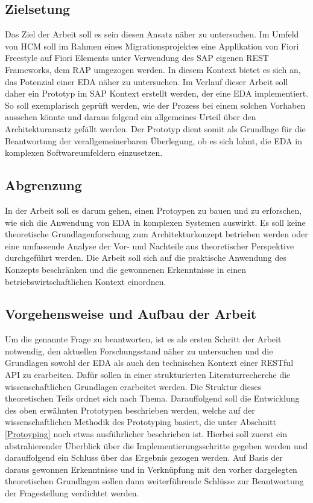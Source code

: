 \subsection{Zielsetung}
Das Ziel der Arbeit soll es sein diesen Ansatz näher zu untersuchen. Im Umfeld von HCM soll im Rahmen eines Migrationsprojektes eine Applikation von Fiori Freestyle auf Fiori Elements unter Verwendung des SAP eigenen \ac{REST} Frameworks, dem \ac{RAP} umgezogen werden. In diesem Kontext bietet es sich an, das Potenzial einer \ac{EDA} näher zu untersuchen. Im Verlauf dieser Arbeit soll daher ein Prototyp im SAP Kontext erstellt werden, der eine \ac{EDA} implementiert. So soll exemplarisch geprüft werden, wie der Prozess bei einem solchen Vorhaben aussehen könnte und daraus folgend ein allgemeines Urteil über den Architekturansatz gefällt werden. Der Prototyp dient somit als Grundlage für die Beantwortung der verallgemeinerbaren Überlegung, ob es sich lohnt, die \ac{EDA} in komplexen Softwareumfeldern einzusetzen.

\subsection{Abgrenzung}

In der Arbeit soll es darum gehen, einen Protoypen zu bauen und zu erforschen, wie sich die Anwendung von \ac{EDA} in komplexen Systemen auswirkt. Es soll keine theoretische Grundlagenforschung zum Architekturkonzept betrieben werden oder eine umfassende Analyse der Vor- und Nachteile aus theoretischer Perspektive durchgeführt werden. Die Arbeit soll sich auf die praktische Anwendung des Konzepts beschränken und die gewonnenen Erkenntnisse in einen betriebswirtschaftlichen Kontext einordnen.

\subsection{Vorgehensweise und Aufbau der Arbeit}
Um die genannte Frage zu beantworten, ist es als ersten Schritt der Arbeit notwendig, den aktuellen Forschungsstand näher zu untersuchen und die Grundlagen sowohl der \ac{EDA} als auch den technischen Kontext einer RESTful API zu erarbeiten. Dafür sollen in einer strukturierten Literaturrecherche die wissenschaftlichen Grundlagen erarbeitet werden. Die Struktur dieses theoretischen Teils ordnet sich nach Thema. Darauffolgend soll die Entwicklung des oben erwähnten Prototypen beschrieben werden, welche auf der wissenschaftlichen Methodik des Prototyping basiert, die unter Abschnitt \ref{Protoyping} noch etwas ausführlicher beschrieben ist. Hierbei soll zuerst ein abstrahierender Überblick über die Implementierungsschritte gegeben werden und darauffolgend ein Schluss über das Ergebnis gezogen werden. Auf Basis der daraus gewonnen Erkenntnisse und in Verknüpfung mit den vorher dargelegten theoretischen Grundlagen sollen dann weiterführende Schlüsse zur Beantwortung der Fragestellung verdichtet werden.